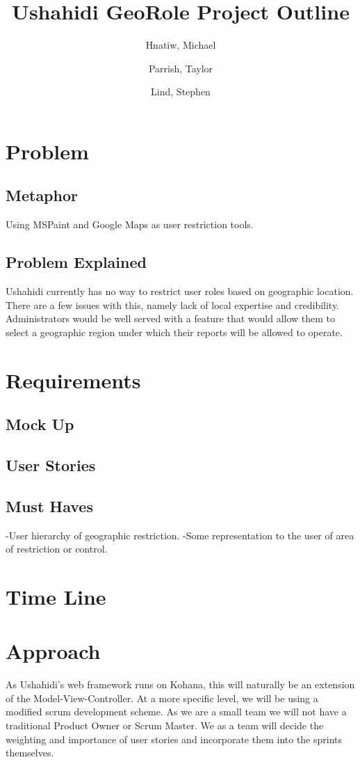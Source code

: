 \documentclass{article}
\begin{document}
\title{Ushahidi GeoRole Project Outline}
\date{}
\author{
   Hnatiw, Michael\\
  \and
  Parrish, Taylor\\
  \and
  Lind, Stephen\\
}
\maketitle

\section{Problem}
\subsection{Metaphor}
Using MSPaint and Google Maps as user restriction tools.
\subsection{Problem Explained}
Ushahidi currently has no way to restrict user roles based on geographic location. There are a few issues with this, namely lack of local expertise and credibility. Administrators would be well served with a feature that would allow them to select a geographic region under which their reports will be allowed to operate.

\section{Requirements}
\subsection{Mock Up}
\subsection{User Stories}
\subsection{Must Haves}
-User hierarchy of geographic restriction.
-Some representation to the user of area of restriction or control.

\section{Time Line}

\section{Approach}
As Ushahidi's web framework runs on Kohana, this will naturally be an extension of the Model-View-Controller. At a more specific level, we will be using a modified scrum development scheme. As we are a small team we will not have a traditional Product Owner or Scrum Master. We as a team will decide the weighting and importance of user stories and incorporate them into the sprints themselves.
\end{document}
